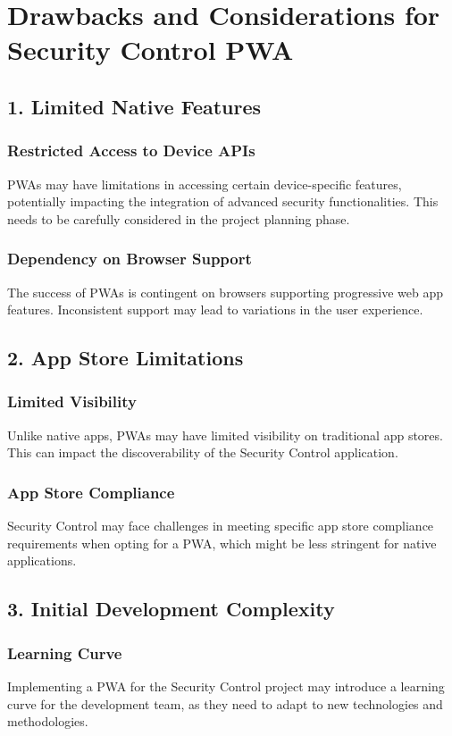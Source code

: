 \documentclass[journal]{IEEEtran}
\begin{document}
	\section*{Drawbacks and Considerations for Security Control PWA}
	\subsection*{1. Limited Native Features}
	\subsubsection*{Restricted Access to Device APIs}
	PWAs may have limitations in accessing certain device-specific features, potentially impacting the integration of advanced security functionalities. This needs to be carefully considered in the project planning phase.
	\subsubsection*{Dependency on Browser Support}
	The success of PWAs is contingent on browsers supporting progressive web app features. Inconsistent support may lead to variations in the user experience.
	
	\subsection*{2. App Store Limitations}
	\subsubsection*{Limited Visibility}
	Unlike native apps, PWAs may have limited visibility on traditional app stores. This can impact the discoverability of the Security Control application.
	\subsubsection*{App Store Compliance}
	Security Control may face challenges in meeting specific app store compliance requirements when opting for a PWA, which might be less stringent for native applications.
	
	\subsection*{3. Initial Development Complexity}
	\subsubsection*{Learning Curve}
	Implementing a PWA for the Security Control project may introduce a learning curve for the development team, as they need to adapt to new technologies and methodologies.
\end{document}
